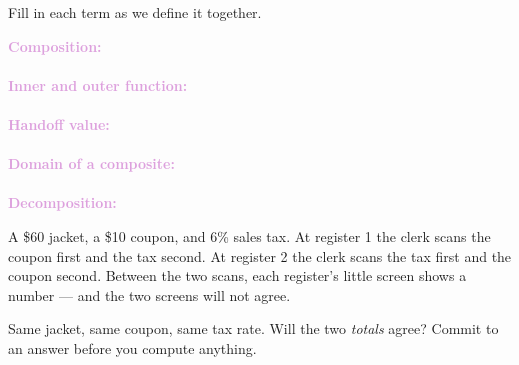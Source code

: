 \documentclass[10pt]{article}
\begin{document}

\vspace{0.12in}

\boxguard
\begin{vocabbox}
Fill in each term as we define it together.
\par\vspace{2pt}
\noindent\textbf{\textcolor{plum}{Composition:}}\\[1pt]
\writeline\\[3pt]
\noindent\textbf{\textcolor{plum}{Inner and outer function:}}\\[1pt]
\writeline\\[3pt]
\noindent\textbf{\textcolor{plum}{Handoff value:}}\\[1pt]
\writeline\\[3pt]
\noindent\textbf{\textcolor{plum}{Domain of a composite:}}\\[1pt]
\writeline\\[3pt]
\noindent\textbf{\textcolor{plum}{Decomposition:}}\\[1pt]
\writeline
\end{vocabbox}

\vspace{0.1in}

\boxguard
\begin{hookbox}
A \$60 jacket, a \$10 coupon, and 6\% sales tax. At register 1 the clerk scans
the coupon first and the tax second. At register 2 the clerk scans the tax first
and the coupon second. Between the two scans, each register's little screen shows
a number --- and the two screens will not agree.

Same jacket, same coupon, same tax rate. Will the two \textit{totals} agree?
Commit to an answer before you compute anything.
\end{hookbox}
\end{document}
